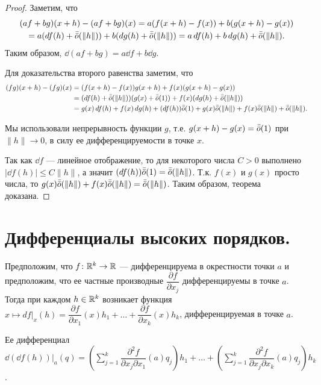 \documentclass[a4paper]{article}
\theoremstyle{named}
\begin{document}
    \begin{proof}
        Заметим, что
        \begin{multline*}
            (af+bg)(x+h) - (af + bg)(x) = a(f(x+h) - f(x)) + b(g(x+h) - g(x))\\
            = a(\mathop{}\!d f(h) + \bar{\bar{o}}(\|h\|)) + b(\mathop{}\!d g (h) + \bar{\bar{o}}(\|h\|))
            = a\mathop{}\!d f(h) + b\mathop{}\!d g(h) + \bar{\bar{o}}(\|h\|).
        \end{multline*}
        Таким образом, $\dd(af + bg) = a\dd f +b\dd g$.

        Для доказательства второго равенства заметим, что
        \begin{align*}
            (fg)(x+h) - (fg)(x) 
            &= (f(x+h) - f(x))g(x+h) + f(x)(g(x+h) - g(x)) \\
            &= (\mathop{}\!d f(h) + \bar{\bar{o}}(\|h\|))(g(x) +\bar{\bar{o}}(1)) + f(x)(\mathop{}\!d g (h) + \bar{\bar{o}}(\|h\|)) \\
            &= g(x)\mathop{}\!d f(h) + f(x)\mathop{}\!d g(h) + (\mathop{}\!d f(h))\bar{\bar{o}}(1) + g(x)\bar{\bar{o}}(\|h\|)+ f(x)\bar{\bar{o}}(\|h\|) + \bar{\bar{o}}(\|h\|).
        \end{align*}

        Мы использовали непрерывность функции $g$, т.е. $g(x+h)-g(x) = \bar{\bar{o}}(1)$ при $\|h\| \to 0$,
        в силу ее дифференцируемости в точке $x$.

        Так как $\dd f$ --- линейное отображение, то для некоторого числа $C>0$ выполнено $|\dd f(h)|\leq C\|h\|$, а значит $(\mathop{}\!d f(h))\bar{\bar{o}}(1) = \bar{\bar{o}}(\|h\|)$.
        Т.к. $f(x)$ и $g(x)$ просто числа, то $ g(x)\bar{\bar{o}}(\|h\|)+ f(x)\bar{\bar{o}}(\|h\|) = \bar{\bar{o}}(\|h\|)$.
        Таким образом, теорема доказана.
    \end{proof}

    \section{Дифференциалы высоких порядков.}

    Предположим, что $f\colon \mathbb{R}^k\to \mathbb{R}$ --- дифференцируема в окрестности точки $a$ и предположим, что ее частные производные
    $\dfrac{\partial f}{\partial x_j}$ дифференцируемы в точке $a$.
    Тогда при каждом $h\in \mathbb{R}^k$ возникает функция $x\mapsto df\bigl|_x(h)=\dfrac{\partial f}{\partial x_1}(x)h_1+\ldots+\dfrac{\partial f}{\partial x_k}(x)h_k$, дифференцируемая в точке $a$.
    
    Ее дифференциал
    $\dd(\dd f(h))\bigl|_a (q)=
    \left(\sum\limits_{j=1}^{k}\dfrac{\partial^2 f}{\partial x_j\partial x_1}(a)q_j\right)h_1+\ldots+
    \left(\sum\limits_{j=1}^{k}\dfrac{\partial^2 f}{\partial x_j\partial x_k}(a)q_j\right)h_k$.
\end{document}
